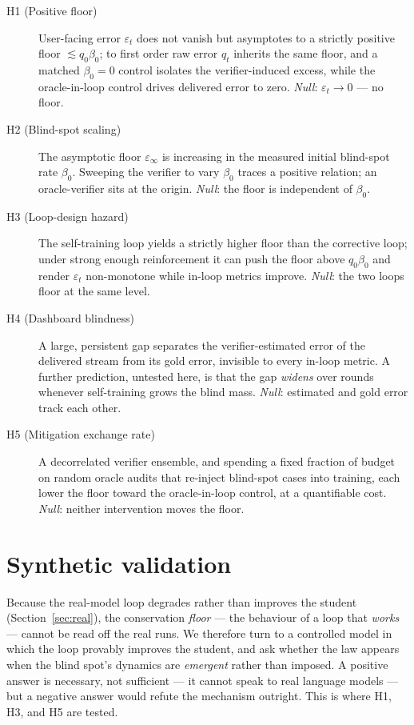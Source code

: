 \documentclass[11pt]{article}
\begin{document}
\begin{description}
\item[H1 (Positive floor)]
User-facing error \(\varepsilon_{t}\) does not vanish but asymptotes to
a strictly positive floor \(\lesssim q_{0}\beta_{0}\); to first order
raw error \(q_{t}\) inherits the same floor, and a matched
\(\beta_{0} = 0\) control isolates the verifier-induced excess, while
the oracle-in-loop control drives delivered error to zero. \emph{Null}:
\(\varepsilon_{t} \rightarrow 0\) --- no floor.
\item[H2 (Blind-spot scaling)]
The asymptotic floor \(\varepsilon_{\infty}\) is increasing in the
measured initial blind-spot rate \(\beta_{0}\). Sweeping the verifier to
vary \(\beta_{0}\) traces a positive relation; an oracle-verifier sits
at the origin. \emph{Null}: the floor is independent of \(\beta_{0}\).
\item[H3 (Loop-design hazard)]
The self-training loop yields a strictly higher floor than the
corrective loop; under strong enough reinforcement it can push the floor
above \(q_{0}\beta_{0}\) and render \(\varepsilon_{t}\) non-monotone
while in-loop metrics improve. \emph{Null}: the two loops floor at the
same level.
\item[H4 (Dashboard blindness)]
A large, persistent gap separates the verifier-estimated error of the
delivered stream from its gold error, invisible to every in-loop metric.
A further prediction, untested here, is that the gap \emph{widens} over
rounds whenever self-training grows the blind mass. \emph{Null}:
estimated and gold error track each other.
\item[H5 (Mitigation exchange rate)]
A decorrelated verifier ensemble, and spending a fixed fraction of
budget on random oracle audits that re-inject blind-spot cases into
training, each lower the floor toward the oracle-in-loop control, at a
quantifiable cost. \emph{Null}: neither intervention moves the floor.
\end{description}

\section{Synthetic validation}

\protect{}\label{sec:exp}{}

Because the real-model loop degrades rather than improves the student
(Section~\ref{sec:real}), the conservation \emph{floor} --- the behaviour
of a loop that \emph{works} --- cannot be read off the real runs. We
therefore turn to a controlled model in which the loop provably improves
the student, and ask whether the law appears when the blind spot's
dynamics are \emph{emergent} rather than imposed. A positive answer is
necessary, not sufficient --- it cannot speak to real language models
--- but a negative answer would refute the mechanism outright. This is
where H1, H3, and H5 are tested.
\end{document}
